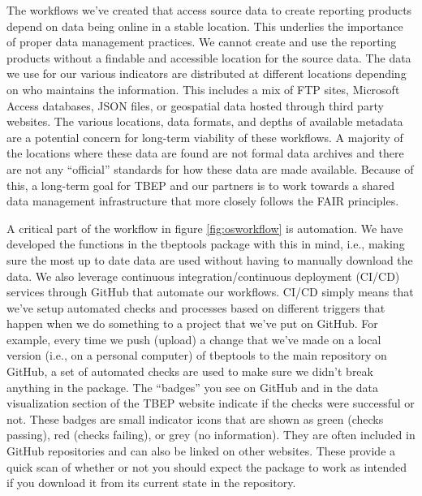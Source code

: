 \documentclass[
]{book}
\begin{document}
The workflows we've created that access source data to create reporting products depend on data being online in a stable location. This underlies the importance of proper data management practices. We cannot create and use the reporting products without a findable and accessible location for the source data. The data we use for our various indicators are distributed at different locations depending on who maintains the information. This includes a mix of FTP sites, Microsoft Access databases, JSON files, or geospatial data hosted through third party websites. The various locations, data formats, and depths of available metadata are a potential concern for long-term viability of these workflows. A majority of the locations where these data are found are not formal data archives and there are not any ``official'' standards for how these data are made available. Because of this, a long-term goal for TBEP and our partners is to work towards a shared data management infrastructure that more closely follows the FAIR principles.

A critical part of the workflow in figure \ref{fig:osworkflow} is automation. We have developed the functions in the tbeptools package with this in mind, i.e., making sure the most up to date data are used without having to manually download the data. We also leverage continuous integration/continuous deployment (CI/CD) services through GitHub that automate our workflows. CI/CD simply means that we've setup automated checks and processes based on different triggers that happen when we do something to a project that we've put on GitHub. For example, every time we push (upload) a change that we've made on a local version (i.e., on a personal computer) of tbeptools to the main repository on GitHub, a set of automated checks are used to make sure we didn't break anything in the package. The ``badges'' you see on GitHub and in the data visualization section of the TBEP website indicate if the checks were successful or not. These badges are small indicator icons that are shown as green (checks passing), red (checks failing), or grey (no information). They are often included in GitHub repositories and can also be linked on other websites. These provide a quick scan of whether or not you should expect the package to work as intended if you download it from its current state in the repository.
\end{document}
